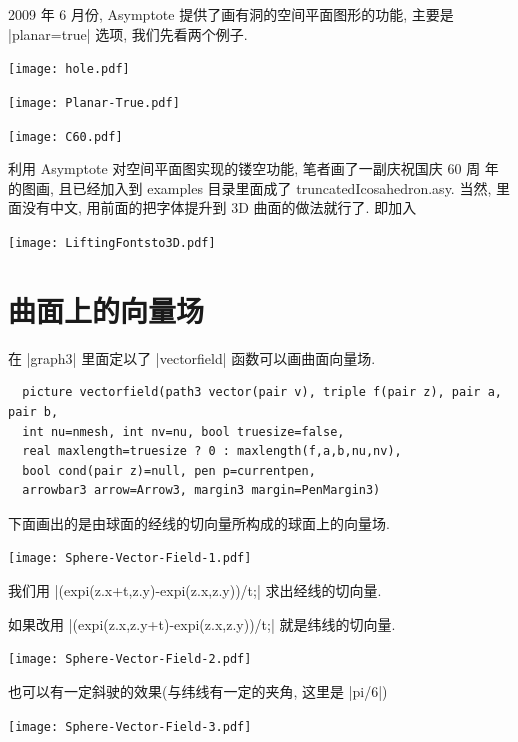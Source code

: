 \documentclass[nofonts,CJKnormalspaces]{ctexbook}
\begin{document}
2009 年 6 月份, Asymptote 提供了画有洞的空间平面图形的功能, 主要是
|planar=true| 选项, 我们先看两个例子.
\begin{center}\texttt{[image: hole.pdf]}\end{center}%

\begin{center}\texttt{[image: Planar-True.pdf]}\end{center}%

\begin{center}\texttt{[image: C60.pdf]}\end{center}%
利用 Asymptote 对空间平面图实现的镂空功能, 笔者画了一副庆祝国庆 60 周
年的图画, 且已经加入到 examples 目录里面成了
truncatedIcosahedron.asy. 当然, 里面没有中文, 用前面的把字体提升到 3D
曲面的做法就行了. 即加入

\begin{center}\texttt{[image: LiftingFontsto3D.pdf]}\end{center}%
% 
\section{曲面上的向量场}
在 |graph3| 里面定以了 |vectorfield| 函数可以画曲面向量场.
\begin{lstlisting}
  picture vectorfield(path3 vector(pair v), triple f(pair z), pair a, pair b,
  int nu=nmesh, int nv=nu, bool truesize=false,
  real maxlength=truesize ? 0 : maxlength(f,a,b,nu,nv),
  bool cond(pair z)=null, pen p=currentpen,
  arrowbar3 arrow=Arrow3, margin3 margin=PenMargin3)
\end{lstlisting}
下面画出的是由球面的经线的切向量所构成的球面上的向量场.
\begin{center}\texttt{[image: Sphere-Vector-Field-1.pdf]}\end{center}%

我们用 |(expi(z.x+t,z.y)-expi(z.x,z.y))/t;| 求出经线的切向量.


如果改用 |(expi(z.x,z.y+t)-expi(z.x,z.y))/t;| 就是纬线的切向量.
\begin{center}\texttt{[image: Sphere-Vector-Field-2.pdf]}\end{center}%


也可以有一定斜驶的效果(与纬线有一定的夹角, 这里是 |pi/6|)
\begin{center}\texttt{[image: Sphere-Vector-Field-3.pdf]}\end{center}%

\end{document}
